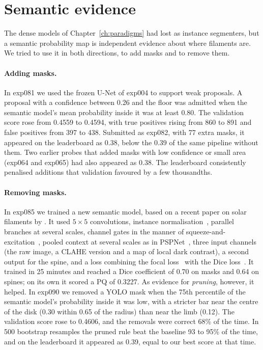 \section{Semantic evidence}\label{sec:recall-semantic}
The dense models of Chapter~\ref{ch:paradigms} had lost as instance segmenters, but a semantic
probability map is independent evidence about where filaments are. We tried to use it in both
directions, to add masks and to remove them.

\paragraph{Adding masks.} In exp081 we used the frozen U-Net of exp004 to support weak proposals. A
proposal with a confidence between 0.26 and the floor was admitted when the semantic model's mean
probability inside it was at least 0.80. The validation score rose from 0.4559 to 0.4594, with true
positives rising from 860 to 891 and false positives from 397 to 438. Submitted as exp082, with 77
extra masks, it appeared on the leaderboard as 0.38, below the 0.39 of the same pipeline without them.
Two earlier probes that added masks with low confidence or small area (exp064 and exp065) had also
appeared as 0.38. The leaderboard consistently penalised additions that validation favoured by a few
thousandths.

\paragraph{Removing masks.} In exp085 we trained a new semantic model, based on a recent paper on
solar filaments by \citet{hu2026morden}. It used $5\times5$ convolutions, instance
normalisation~\citep{ulyanov2016}, parallel branches at several scales, channel gates in the manner
of squeeze-and-excitation~\citep{hu2018senet}, pooled context at several scales as in
PSPNet~\citep{zhao2017pspnet}, three input channels (the
raw image, a CLAHE version and a map of local dark contrast), a second output for the spine, and a
loss combining the focal loss~\citep{focal} with the Dice loss~\citep{vnet}. It trained in 25 minutes and reached a
Dice coefficient of 0.70 on masks and 0.64 on spines; on its own it scored a PQ of 0.3227. As evidence
for \emph{pruning}, however, it helped. In exp090 we removed a YOLO mask when the 75th percentile of
the semantic model's probability inside it was low, with a stricter bar near the centre of the disk
(0.30 within 0.65 of the radius) than near the limb (0.12). The validation score rose to 0.4606, and
the removals were correct 68\% of the time. In 500 bootstrap resamples the pruned rule beat the
baseline 93 to 95\% of the time, and on the leaderboard it appeared as 0.39, equal to our best score
at that time.


